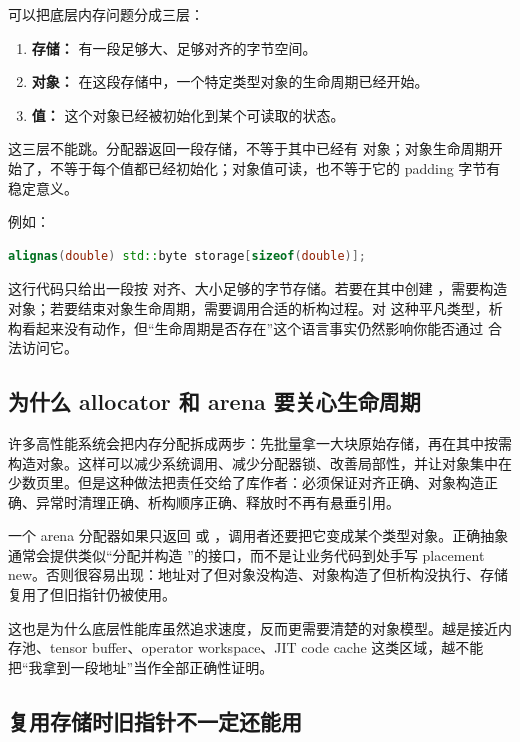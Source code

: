 可以把底层内存问题分成三层：

\begin{enumerate}
  \item \textbf{存储：} 有一段足够大、足够对齐的字节空间。
  \item \textbf{对象：} 在这段存储中，一个特定类型对象的生命周期已经开始。
  \item \textbf{值：} 这个对象已经被初始化到某个可读取的状态。
\end{enumerate}

这三层不能跳。分配器返回一段存储，不等于其中已经有  对象；对象生命周期开始了，不等于每个值都已经初始化；对象值可读，也不等于它的 padding 字节有稳定意义。

例如：

\begin{lstlisting}[language=C++]
alignas(double) std::byte storage[sizeof(double)];
\end{lstlisting}

这行代码只给出一段按  对齐、大小足够的字节存储。若要在其中创建 ，需要构造对象；若要结束对象生命周期，需要调用合适的析构过程。对  这种平凡类型，析构看起来没有动作，但“生命周期是否存在”这个语言事实仍然影响你能否通过  合法访问它。

\subsection{为什么 allocator 和 arena 要关心生命周期}

许多高性能系统会把内存分配拆成两步：先批量拿一大块原始存储，再在其中按需构造对象。这样可以减少系统调用、减少分配器锁、改善局部性，并让对象集中在少数页里。但是这种做法把责任交给了库作者：必须保证对齐正确、对象构造正确、异常时清理正确、析构顺序正确、释放时不再有悬垂引用。

一个 arena 分配器如果只返回  或 ，调用者还要把它变成某个类型对象。正确抽象通常会提供类似“分配并构造 ”的接口，而不是让业务代码到处手写 placement new。否则很容易出现：地址对了但对象没构造、对象构造了但析构没执行、存储复用了但旧指针仍被使用。

这也是为什么底层性能库虽然追求速度，反而更需要清楚的对象模型。越是接近内存池、tensor buffer、operator workspace、JIT code cache 这类区域，越不能把“我拿到一段地址”当作全部正确性证明。

\subsection{复用存储时旧指针不一定还能用}


